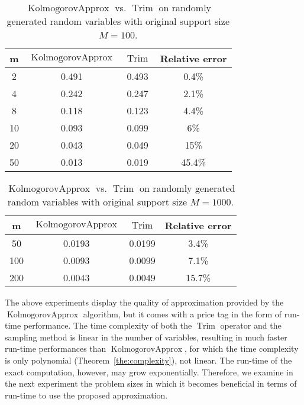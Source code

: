 \documentclass{article}
\DeclareMathOperator{\Trim}{Trim}
\DeclareMathOperator{\OptTrim}{KolmogorovApprox}
\begin{document}
\begin{table}[tbp]
	\scriptsize
	\centering
	\begin{tabular}{|c|c|c|c|}
		\hline
		m  & $\OptTrim$	& $\Trim$	& Relative error  \\ \hline
		2  & 0.491			& 0.493		& 0.4\%            \\ \hline
		4  & 0.242			& 0.247 	& 2.1\%            \\ \hline
		8  & 0.118 			& 0.123 	& 4.4\%            \\ \hline
		10 & 0.093			& 0.099		& 6\%              \\ \hline
		20 & 0.043			& 0.049		& 15\%             \\ \hline
		50 & 0.013 			& 0.019 	& 45.4\%           \\ \hline
	\end{tabular}
	\caption{$\OptTrim$ vs. $\Trim$ on randomly generated random variables with original support size $M=100$.}
	\label{tab:trimvsoptrim}
\end{table}



\begin{table}[tbp]
	\scriptsize
	\centering
	\begin{tabular}{|c|c|c|c|}
		\hline
		m   & $\OptTrim$	& $\Trim$	& Relative error  \\ \hline
		50  & 0.0193			& 0.0199	& 3.4\%            \\ \hline
		100 & 0.0093			& 0.0099	& 7.1\%            \\ \hline
		200 & 0.0043			& 0.0049	& 15.7\%           \\ \hline
	\end{tabular}
	\caption{$\OptTrim$ vs. $\Trim$ on randomly generated random variables with original support size $M=1000$.}
	\label{tab:trimvsoptrim2}
\end{table}

The above experiments display the quality of approximation provided by the $\OptTrim$ algorithm, but it comes with a price tag in the form of run-time performance. The time complexity of both the $\Trim$ operator and the sampling method is linear in the number of variables, resulting in much faster run-time performances than $\OptTrim$, for which the time complexity is only polynomial (Theorem~\ref{the:complexity}), not linear. The run-time of the exact computation, however,  may grow exponentially. Therefore, we examine in the next experiment the problem sizes in which it becomes beneficial in terms of run-time to use the proposed approximation.
\end{document}
